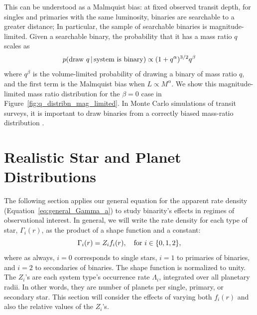 \documentclass[12pt,modern]{aastex61}
\begin{document}
This can be understood as a Malmquist bias: at fixed observed transit 
depth, for singles and primaries with the same luminosity, binaries are 
searchable to a greater distance;
In particular, the sample of searchable binaries is magnitude-limited.
Given a searchable binary, the probability that it has a mass ratio $q$ 
scales as
\begin{equation}
p({\rm draw\ }q\,|\,{\rm system\ is\ binary}) \propto 
(1+q^\alpha)^{3/2} q^\beta 
\label{eq:Malmquist_bias}
\end{equation}
where $q^\beta$ is the volume-limited probability of drawing a binary of mass 
ratio $q$, and the first term is the Malmquist bias when $L\propto M^\alpha$.
We show this magnitude-limited mass ratio distribution for the $\beta=0$ case 
in Figure~\ref{fig:q_distribn_mag_limited}.
In Monte Carlo simulations of transit surveys, it is 
important to draw binaries from a correctly biased mass-ratio distribution 
\citep[\textit{e.g.},][]{bakos_hatsouth:_2013,sullivan_transiting_2015,
    gunther_new_2017}.



%

\section{Realistic Star and Planet Distributions}
\label{sec:more_complicated}
The following section applies our general equation for the apparent rate 
density (Equation~\ref{eq:general_Gamma_a}) to study binarity's effects in 
regimes 
of observational interest.
In general, we will write the rate density for each type of star, 
$\Gamma_i(r)$, as the product of a shape function and a constant:
\begin{equation}
\Gamma_i(r) = Z_i f_i(r), \quad {\rm for\ }i\in\{0,1,2\},
\end{equation}
where as always, $i=0$ corresponds to single stars, $i=1$ to primaries of 
binaries, and $i=2$ to secondaries of binaries.
The shape function is normalized to unity.
The $Z_i$'s are each system type's occurrence rate $\Lambda_i$, integrated 
over all planetary radii. In other words, they are number of planets per 
single, primary, or secondary star.
This section will consider the effects of varying both $f_i(r)$ and also the
relative values of the $Z_i$'s.

\end{document}
